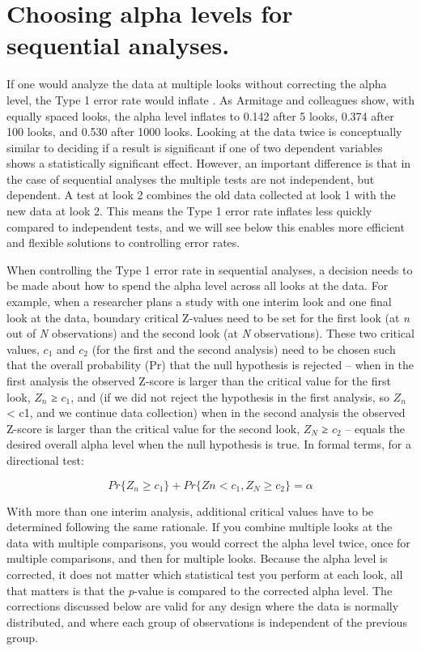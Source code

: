 \documentclass[
  oneside]{krantz}
\begin{document}
\hypertarget{choosing-alpha-levels-for-sequential-analyses.}{%
\section{Choosing alpha levels for sequential analyses.}\label{choosing-alpha-levels-for-sequential-analyses.}}

If one would analyze the data at multiple looks without correcting the alpha level, the Type 1 error rate would inflate \citep{armitage_repeated_1969}. As Armitage and colleagues show, with equally spaced looks, the alpha level inflates to 0.142 after 5 looks, 0.374 after 100 looks, and 0.530 after 1000 looks. Looking at the data twice is conceptually similar to deciding if a result is significant if one of two dependent variables shows a statistically significant effect. However, an important difference is that in the case of sequential analyses the multiple tests are not independent, but dependent. A test at look 2 combines the old data collected at look 1 with the new data at look 2. This means the Type 1 error rate inflates less quickly compared to independent tests, and we will see below this enables more efficient and flexible solutions to controlling error rates.

When controlling the Type 1 error rate in sequential analyses, a decision needs to be made about how to spend the alpha level across all looks at the data. For example, when a researcher plans a study with one interim look and one final look at the data, boundary critical Z-values need to be set for the first look (at \emph{n} out of \emph{N} observations) and the second look (at \emph{N} observations). These two critical values, \(c_1\) and \(c_2\) (for the first and the second analysis) need to be chosen such that the overall probability (Pr) that the null hypothesis is rejected -- when in the first analysis the observed Z-score is larger than the critical value for the first look, \(Z_n\) ≥ \(c_1\), and (if we did not reject the hypothesis in the first analysis, so \(Z_n\) \textless{} c1, and we continue data collection) when in the second analysis the observed Z-score is larger than the critical value for the second look, \(Z_N\) ≥ \(c_2\) -- equals the desired overall alpha level when the null hypothesis is true. In formal terms, for a directional test:

\[
Pr\{Z_n \geq c_1\} + Pr\{Zn < c_1, Z_N \geq c_2\} = \alpha
\]

With more than one interim analysis, additional critical values have to be determined following the same rationale. If you combine multiple looks at the data with multiple comparisons, you would correct the alpha level twice, once for multiple comparisons, and then for multiple looks. Because the alpha level is corrected, it does not matter which statistical test you perform at each look, all that matters is that the \emph{p}-value is compared to the corrected alpha level. The corrections discussed below are valid for any design where the data is normally distributed, and where each group of observations is independent of the previous group.
\end{document}
